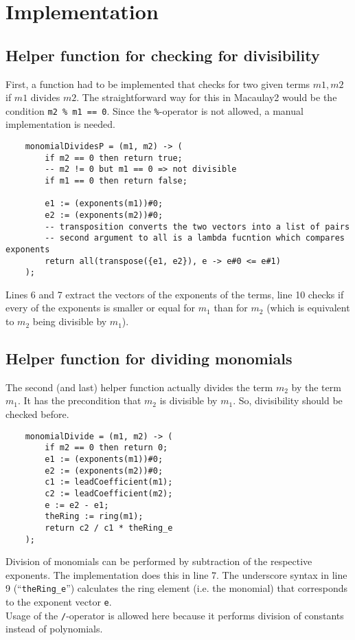 \documentclass[a4paper,article,math]{extarticle}
\begin{document}
\section{Implementation}
\subsection{Helper function for checking for divisibility}
First, a function had to be implemented that checks for two given terms $m1, m2$ if $m1$ divides $m2$.
The straightforward way for this in Macaulay2 would be the condition \texttt{m2 \% m1 == 0}.
Since the \texttt{\%}-operator is not allowed, a manual implementation is needed.
\begin{lstlisting}
	monomialDividesP = (m1, m2) -> (
		if m2 == 0 then return true;
		-- m2 != 0 but m1 == 0 => not divisible
		if m1 == 0 then return false;
		
		e1 := (exponents(m1))#0;
		e2 := (exponents(m2))#0;
		-- transposition converts the two vectors into a list of pairs
		-- second argument to all is a lambda fucntion which compares exponents
		return all(transpose({e1, e2}), e -> e#0 <= e#1)
	);
\end{lstlisting}
Lines 6 and 7 extract the vectors of the exponents of the terms, line 10 checks if every of the exponents is smaller or equal for $m_1$ than for $m_2$ (which is equivalent to $m_2$ being divisible by $m_1$).
\subsection{Helper function for dividing monomials}
The second (and last) helper function actually divides the term $m_2$ by the term $m_1$.
It has the precondition that $m_2$ is divisible by $m_1$.
So, divisibility should be checked before.
\begin{lstlisting}
	monomialDivide = (m1, m2) -> (
		if m2 == 0 then return 0;
		e1 := (exponents(m1))#0;
		e2 := (exponents(m2))#0;
		c1 := leadCoefficient(m1);
		c2 := leadCoefficient(m2);
		e := e2 - e1;
		theRing := ring(m1);
		return c2 / c1 * theRing_e
	);
\end{lstlisting}
Division of monomials can be performed by subtraction of the respective exponents.
The implementation does this in line 7.
The underscore syntax in line 9 (“\texttt{theRing\_e}”) calculates the ring element (i.e. the monomial) that corresponds to the exponent vector \texttt{e}.\\
Usage of the \texttt{/}-operator is allowed here because it performs division of constants instead of polynomials.
\pagebreak
\end{document}
